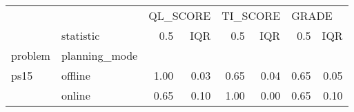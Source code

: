 \begin{tabular}{llrrrrrr}
\toprule
     & {} & \multicolumn{2}{l}{QL\_SCORE} & \multicolumn{2}{l}{TI\_SCORE} & \multicolumn{2}{l}{GRADE} \\
     & statistic &      0.5 &  IQR &      0.5 &  IQR &   0.5 &  IQR \\
problem & planning\_mode &          &      &          &      &       &      \\
\midrule
ps15 & offline &     1.00 & 0.03 &     0.65 & 0.04 &  0.65 & 0.05 \\
     & online &     0.65 & 0.10 &     1.00 & 0.00 &  0.65 & 0.10 \\
\bottomrule
\end{tabular}

